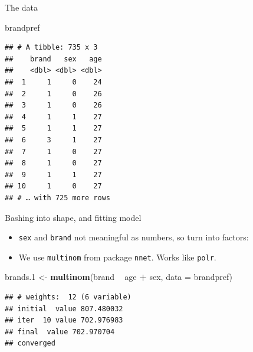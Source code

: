 \documentclass[ignorenonframetext,]{beamer}
\newenvironment{Shaded}{\begin{snugshade}}{\end{snugshade}}
\newcommand{\DataTypeTok}[1]{\textcolor[rgb]{0.13,0.29,0.53}{#1}}
\newcommand{\FloatTok}[1]{\textcolor[rgb]{0.00,0.00,0.81}{#1}}
\newcommand{\KeywordTok}[1]{\textcolor[rgb]{0.13,0.29,0.53}{\textbf{#1}}}
\newcommand{\NormalTok}[1]{#1}
\newcommand{\OperatorTok}[1]{\textcolor[rgb]{0.81,0.36,0.00}{\textbf{#1}}}
\newcommand{\StringTok}[1]{\textcolor[rgb]{0.31,0.60,0.02}{#1}}
\providecommand{\tightlist}{%
  \setlength{\itemsep}{0pt}\setlength{\parskip}{0pt}}
\begin{document}
\begin{frame}[fragile]{The data}
\protect\hypertarget{the-data-4}{}

\begin{Shaded}
\begin{Highlighting}[]
\NormalTok{brandpref}
\end{Highlighting}
\end{Shaded}

\begin{verbatim}
## # A tibble: 735 x 3
##    brand   sex   age
##    <dbl> <dbl> <dbl>
##  1     1     0    24
##  2     1     0    26
##  3     1     0    26
##  4     1     1    27
##  5     1     1    27
##  6     3     1    27
##  7     1     0    27
##  8     1     0    27
##  9     1     1    27
## 10     1     0    27
## # … with 725 more rows
\end{verbatim}

\end{frame}

\begin{frame}[fragile]{Bashing into shape, and fitting model}
\protect\hypertarget{bashing-into-shape-and-fitting-model}{}

\begin{itemize}
\tightlist
\item
  \texttt{sex} and \texttt{brand} not meaningful as numbers, so turn
  into factors:
\end{itemize}

\begin{Shaded}
\end{Shaded}

\begin{itemize}
\tightlist
\item
  We use \texttt{multinom} from package \texttt{nnet}. Works like
  \texttt{polr}.
\end{itemize}

\begin{Shaded}
\begin{Highlighting}[]
\NormalTok{brands}\FloatTok{.1}\NormalTok{ <-}\StringTok{ }\KeywordTok{multinom}\NormalTok{(brand }\OperatorTok{~}\StringTok{ }\NormalTok{age }\OperatorTok{+}\StringTok{ }\NormalTok{sex, }\DataTypeTok{data =}\NormalTok{ brandpref)}
\end{Highlighting}
\end{Shaded}

\begin{verbatim}
## # weights:  12 (6 variable)
## initial  value 807.480032 
## iter  10 value 702.976983
## final  value 702.970704 
## converged
\end{verbatim}

\end{frame}
\end{document}
